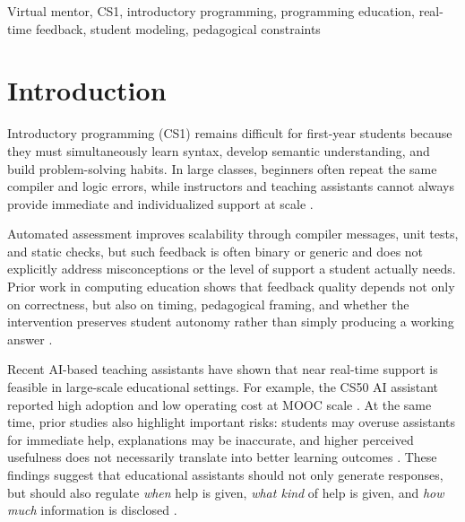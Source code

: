 \documentclass[conference]{IEEEtran}
\begin{document}
\begin{IEEEkeywords}
Virtual mentor, CS1, introductory programming, programming education, real-time feedback, student modeling, pedagogical constraints
\end{IEEEkeywords}

\section{Introduction}

Introductory programming (CS1) remains difficult for first-year students because they must simultaneously learn syntax, develop semantic understanding, and build problem-solving habits. In large classes, beginners often repeat the same compiler and logic errors, while instructors and teaching assistants cannot always provide immediate and individualized support at scale \cite{DesirableCharacteristicsforAITeachingAssistantsinProgrammingEducation,FeasibilityStudyofAugmentingTeachingAssistantswithAI}.

Automated assessment improves scalability through compiler messages, unit tests, and static checks, but such feedback is often binary or generic and does not explicitly address misconceptions or the level of support a student actually needs. Prior work in computing education shows that feedback quality depends not only on correctness, but also on timing, pedagogical framing, and whether the intervention preserves student autonomy rather than simply producing a working answer \cite{SystematicLiteratureReviewonLLM,DesirableCharacteristicsforAITeachingAssistantsinProgrammingEducation}.

Recent AI-based teaching assistants have shown that near real-time support is feasible in large-scale educational settings. For example, the CS50 AI assistant reported high adoption and low operating cost at MOOC scale \cite{ImprovingAIinCS50}. At the same time, prior studies also highlight important risks: students may overuse assistants for immediate help, explanations may be inaccurate, and higher perceived usefulness does not necessarily translate into better learning outcomes \cite{FeasibilityStudyofAugmentingTeachingAssistantswithAI,PatternsofLLMPoweredProgrammingAssistant,SystematicLiteratureReviewonLLM}. These findings suggest that educational assistants should not only generate responses, but should also regulate \emph{when} help is given, \emph{what kind} of help is given, and \emph{how much} information is disclosed \cite{CodeAid,IRIS,DesirableCharacteristicsforAITeachingAssistantsinProgrammingEducation}.
\end{document}
